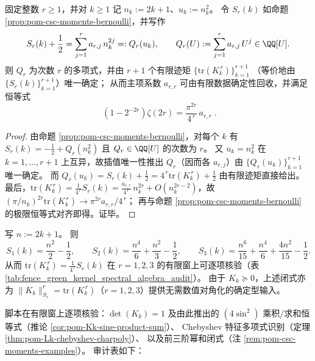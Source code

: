\begin{corollary}\label{cor:pom-csc-moments-finite-trace-inversion}
固定整数 \(r\ge 1\)，并对 \(k\ge 1\) 记 \(n_k:=2k+1\)、\(u_k:=n_k^2\)。
令 \(S_r(k)\) 如命题 \ref{prop:pom-csc-moments-bernoulli}，并写作
\[
S_r(k)+\frac12=\sum_{j=1}^{r}a_{r,j}\,n_k^{2j}=:Q_r(u_k),
\qquad
Q_r(U):=\sum_{j=1}^{r}a_{r,j}\,U^{j}\in\QQ[U].
\]
则 \(Q_r\) 为次数 \(r\) 的多项式，并由 \(r+1\) 个有限迹矩
\(
\{\mathrm{tr}(K_k^{\,r})\}_{k=1}^{r+1}
\)
（等价地由 \(\{S_r(k)\}_{k=1}^{r+1}\)）唯一确定；
从而主项系数 \(a_{r,r}\) 可由有限数据确定性回收，并满足恒等式
\[
\boxed{\;
(1-2^{-2r})\zeta(2r)=\frac{\pi^{2r}}{4^{\,r}}\,a_{r,r}\; }.
\]
\end{corollary}
\begin{proof}
由命题 \ref{prop:pom-csc-moments-bernoulli}，对每个 \(k\) 有 \(S_r(k)=-\frac12+Q_r(n_k^2)\) 且 \(Q_r\in\QQ[U]\) 的次数为 \(r\)。
又 \(u_k=n_k^2\) 在 \(k=1,\dots,r+1\) 上互异，故插值唯一性推出 \(Q_r\)（因而各 \(a_{r,j}\)）由 \(\{Q_r(u_k)\}_{k=1}^{r+1}\) 唯一确定。
而 \(Q_r(u_k)=S_r(k)+\frac12=4^{\,r}\mathrm{tr}(K_k^{\,r})+\frac12\) 由有限迹矩直接给出。
最后，\(\mathrm{tr}(K_k^{\,r})=\frac{1}{4^{\,r}}S_r(k)=\frac{a_{r,r}}{4^{\,r}}\,n_k^{2r}+O(n_k^{2r-2})\)，故
\(
(\pi/n_k)^{2r}\mathrm{tr}(K_k^{\,r})\to \pi^{2r}a_{r,r}/4^{\,r}
\)；
再与命题 \ref{prop:pom-csc-moments-bernoulli} 的极限恒等式对齐即得。证毕。
\end{proof}

\begin{remark}\label{rem:pom-csc-moments-examples}
写 \(n:=2k+1\)。
则
\[
S_1(k)=\frac{n^2}{2}-\frac12,\qquad
S_2(k)=\frac{n^4}{6}+\frac{n^2}{3}-\frac12,\qquad
S_3(k)=\frac{n^6}{15}+\frac{n^4}{6}+\frac{4n^2}{15}-\frac12.
\]
从而 \(\mathrm{tr}(K_k^{\,r})=\frac{1}{4^{\,r}}S_r(k)\) 在 \(r=1,2,3\) 的有限窗上可逐项核验（表 \ref{tab:fence_green_kernel_spectral_algebra_audit}）。
由于 \(K_k\succeq 0\)，上述闭式亦为 \(\|K_k\|_{S_r}^r=\mathrm{tr}(K_k^{\,r})\)（\(r=1,2,3\)）提供无需数值对角化的确定型输入。
\end{remark}

\begin{remark}\label{rem:pom-fence-green-kernel-spectral-algebra-audit}
脚本在有限窗上逐项核验：\(\det(K_k)=1\) 及由此推出的 \((4\sin^2)\) 乘积/求和恒等式（推论 \ref{cor:pom-Kk-sine-product-sum}）、
Chebyshev 特征多项式识别（定理 \ref{thm:pom-Lk-chebyshev-charpoly}）、
以及前三阶幂和闭式（注 \ref{rem:pom-csc-moments-examples}）。
审计表如下：

\end{remark}

